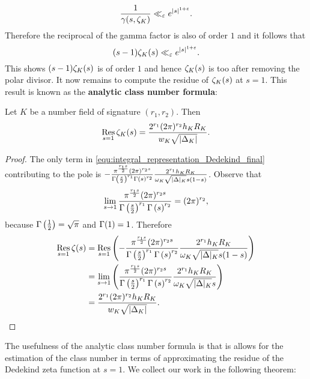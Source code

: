       \[
        \frac{1}{\gamma(s,\zeta_{K})} \ll_{\varepsilon} e^{|s|^{1+\varepsilon}}.
      \]
      Therefore the reciprocal of the gamma factor is also of order $1$ and it follows that
      \[
        (s-1)\zeta_{K}(s) \ll_{\varepsilon} e^{|s|^{1+\varepsilon}}.
      \]
      This shows $(s-1)\zeta_{K}(s)$ is of order $1$ and hence $\zeta_{K}(s)$ is too after removing the polar divisor. It now remains to compute the residue of $\zeta_{K}(s)$ at $s = 1$. This result is known as the \textbf{analytic class number formula}:

      \begin{theorem}
        Let $K$ be a number field of signature $(r_{1},r_{2})$. Then
        \[
          \operatorname*{\mathrm{Res}}_{s = 1}\zeta_{K}(s) = \frac{2^{r_{1}}(2\pi)^{r_{2}}h_{K}R_{K}}{w_{K}\sqrt{|\Delta_{K}|}}.
        \]
      \end{theorem}
      \begin{proof}
        The only term in \cref{equ:integral_representation_Dedekind_final} contributing to the pole is $-\frac{\pi^{\frac{r_{1}s}{2}}(2\pi)^{r_{2}s}}{\Gamma\left(\frac{s}{2}\right)^{r_{1}}\Gamma\left(s\right)^{r_{2}}}\frac{2^{r_{1}}h_{K}R_{K}}{\omega_{K}\sqrt{|\Delta|_{K}}s(1-s)}$. Observe that
        \[
          \lim_{s \to 1}\frac{\pi^{\frac{r_{1}s}{2}}(2\pi)^{r_{2}s}}{\Gamma\left(\frac{s}{2}\right)^{r_{1}}\Gamma\left(s\right)^{r_{2}}} = (2\pi)^{r_{2}},
        \]
        because $\Gamma\left(\frac{1}{2}\right) = \sqrt{\pi}$ and $\Gamma(1) = 1$. Therefore
        \begin{align*}
          \operatorname*{\mathrm{Res}}_{s = 1}\zeta(s) &= \operatorname*{\mathrm{Res}}_{s = 1}\left(-\frac{\pi^{\frac{r_{1}s}{2}}(2\pi)^{r_{2}s}}{\Gamma\left(\frac{s}{2}\right)^{r_{1}}\Gamma\left(s\right)^{r_{2}}}\frac{2^{r_{1}}h_{K}R_{K}}{\omega_{K}\sqrt{|\Delta|_{K}}s(1-s)}\right) \\
          &= \lim_{s \to 1}\left(\frac{\pi^{\frac{r_{1}s}{2}}(2\pi)^{r_{2}s}}{\Gamma\left(\frac{s}{2}\right)^{r_{1}}\Gamma\left(s\right)^{r_{2}}}\frac{2^{r_{1}}h_{K}R_{K}}{\omega_{K}\sqrt{|\Delta|_{K}}s}\right) \\
          &= \frac{2^{r_{1}}(2\pi)^{r_{2}}h_{K}R_{K}}{w_{K}\sqrt{|\Delta_{K}|}}.
        \end{align*}
      \end{proof}

      The usefulness of the analytic class number formula is that is allows for the estimation of the class number in terms of approximating the residue of the Dedekind zeta function at $s = 1$. We collect our work in the following theorem:


